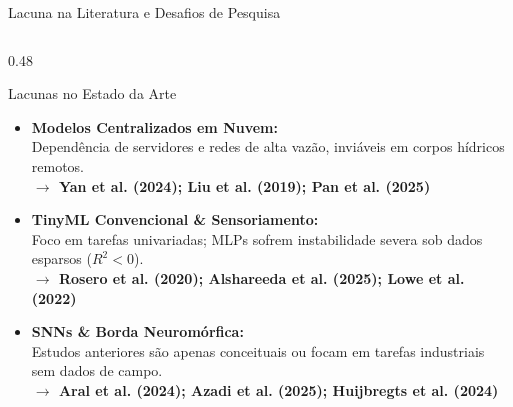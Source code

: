 \documentclass[aspectratio=169,10pt]{beamer}
\begin{document}
\begin{frame}{Lacuna na Literatura e Desafios de Pesquisa}
  \begin{columns}[T,onlytextwidth]
    \begin{column}{0.48\linewidth}
      \begin{alertblock}{Lacunas no Estado da Arte}
        \footnotesize
        \begin{itemize}
          \item \textbf{Modelos Centralizados em Nuvem:}\\
          {\scriptsize Dependência de servidores e redes de alta vazão, inviáveis em corpos hídricos remotos.\\
          \color{CBAPurple!90!black}\textbf{\tiny$\to$ Yan et al. (2024); Liu et al. (2019); Pan et al. (2025)}}
          \vspace{0.08cm}
          \item \textbf{TinyML Convencional \& Sensoriamento:}\\
          {\scriptsize Foco em tarefas univariadas; MLPs sofrem instabilidade severa sob dados esparsos ($R^2 < 0$).\\
          \color{CBAPurple!90!black}\textbf{\tiny$\to$ Rosero et al. (2020); Alshareeda et al. (2025); Lowe et al. (2022)}}
          \vspace{0.08cm}
          \item \textbf{SNNs \& Borda Neuromórfica:}\\
          {\scriptsize Estudos anteriores são apenas conceituais ou focam em tarefas industriais sem dados de campo.\\
          \color{CBAPurple!90!black}\textbf{\tiny$\to$ Aral et al. (2024); Azadi et al. (2025); Huijbregts et al. (2024)}}
        \end{itemize}
      \end{alertblock}
    \end{column}


\end{columns}
\end{frame}
\end{document}
